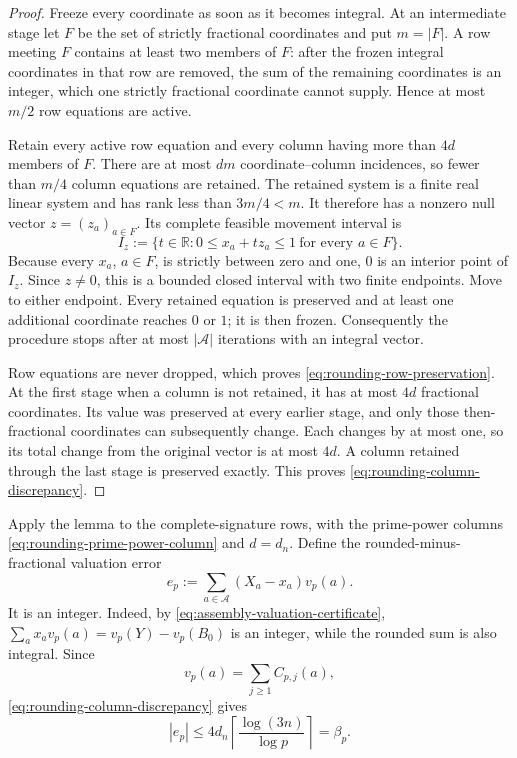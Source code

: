 \documentclass[11pt]{article}
\numberwithin{equation}{section}
\theoremstyle{definition}
\theoremstyle{remark}
\newcommand{\1}{\mathbf 1}
\begin{document}
\begin{proof}
Freeze every coordinate as soon as it becomes integral.  At an
intermediate stage let \(F\) be the set of strictly fractional
coordinates and put \(m=|F|\).  A row meeting \(F\) contains at least two
members of \(F\): after the frozen integral coordinates in that row are
removed, the sum of the remaining coordinates is an integer, which one
strictly fractional coordinate cannot supply.  Hence at most \(m/2\) row
equations are active.

Retain every active row equation and every column having more than \(4d\)
members of \(F\).  There are at most \(dm\) coordinate--column incidences,
so fewer than \(m/4\) column equations are retained.  The retained system
is a finite real linear system and has rank less than \(3m/4<m\).  It
therefore has a nonzero null vector \(z=(z_a)_{a\in F}\).  Its complete
feasible movement interval is
\[
 I_z:=\{t\in\mathbb R:
            0\leq x_a+tz_a\leq1\ \text{for every }a\in F\}.
\]
Because every \(x_a\), \(a\in F\), is strictly between zero and one,
\(0\) is an interior point of \(I_z\).  Since \(z\ne0\), this is a
bounded closed interval with two finite endpoints.  Move to either
endpoint.  Every retained equation is preserved and at least one
additional coordinate reaches \(0\) or \(1\); it is then frozen.
Consequently the procedure stops after at most \(|\mathcal A|\)
iterations with an integral vector.

Row equations are never dropped, which proves
\eqref{eq:rounding-row-preservation}.  At the first stage when a column
is not retained, it has at most \(4d\) fractional coordinates.  Its value
was preserved at every earlier stage, and only those then-fractional
coordinates can subsequently change.  Each changes by at most one, so
its total change from the original vector is at most \(4d\).  A column
retained through the last stage is preserved exactly.  This proves
\eqref{eq:rounding-column-discrepancy}.
\end{proof}

Apply the lemma to the complete-signature rows, with the prime-power
columns \eqref{eq:rounding-prime-power-column} and \(d=d_n\).  Define the
rounded-minus-fractional valuation error
\begin{equation}
                  e_p:=\sum_{a\in\mathcal A}(X_a-x_a)v_p(a).
 \label{eq:rounding-error-sign}
\end{equation}
It is an integer.  Indeed, by
\eqref{eq:assembly-valuation-certificate},
\(\sum_ax_av_p(a)=v_p(Y)-v_p(B_0)\) is an integer, while the rounded sum
is also integral.  Since
\[
                         v_p(a)=\sum_{j\ge1}C_{p,j}(a),
\]
\eqref{eq:rounding-column-discrepancy} gives
\begin{equation}
 |e_p|\le4d_n\left\lceil\frac{\log(3n)}{\log p}\right\rceil
         =\beta_p.
 \label{eq:rounding-error-box}
\end{equation}
\end{document}
